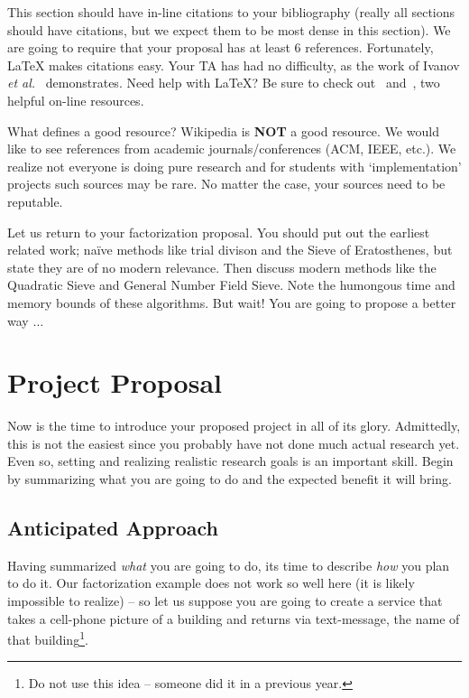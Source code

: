 \documentclass{sig-alternate}
\begin{document}
This section should have in-line citations to your bibliography
(really all sections should have citations, but we expect them to be
most dense in this section). We are going to require that your
proposal has at least $6$ references. Fortunately, \LaTeX{} makes
citations easy. Your TA has had no difficulty, as the work of Ivanov
\textit{et al.}~\cite{ivanov14} demonstrates. Need help with \LaTeX{}?
Be sure to check out~\cite{latex_wikibook} and~\cite{ctan_pdf}, two
helpful on-line resources.

What defines a good resource? Wikipedia is \textbf{NOT} a good
resource. We would like to see references from academic
journals/conferences (ACM, IEEE, etc.). We realize not everyone is
doing pure research and for students with `implementation' projects
such sources may be rare. No matter the case, your sources need to be
reputable.

Let us return to your factorization proposal. You should put out the
earliest related work; na\"{i}ve methods like trial divison and the
Sieve of Eratosthenes, but state they are of no modern relevance. Then
discuss modern methods like the Quadratic Sieve and General Number
Field Sieve. Note the humongous time and memory bounds of these
algorithms. But wait! You are going to propose a better way $\ldots$

\section{Project Proposal}
\label{sec:project_proposal}
Now is the time to introduce your proposed project in all of its
glory. Admittedly, this is not the easiest since you probably have not
done much actual research yet. Even so, setting and realizing
realistic research goals is an important skill. Begin by summarizing
what you are going to do and the expected benefit it will bring.

\subsection{Anticipated Approach}
\label{subsec:approach}
Having summarized \textit{what} you are going to do, its time to
describe \textit{how} you plan to do it. Our factorization example
does not work so well here (it is likely impossible to realize) -- so
let us suppose you are going to create a service that takes a
cell-phone picture of a building and returns via text-message, the
name of that building\footnote{Do not use this idea -- someone did it
  in a previous year.}.
\end{document}

